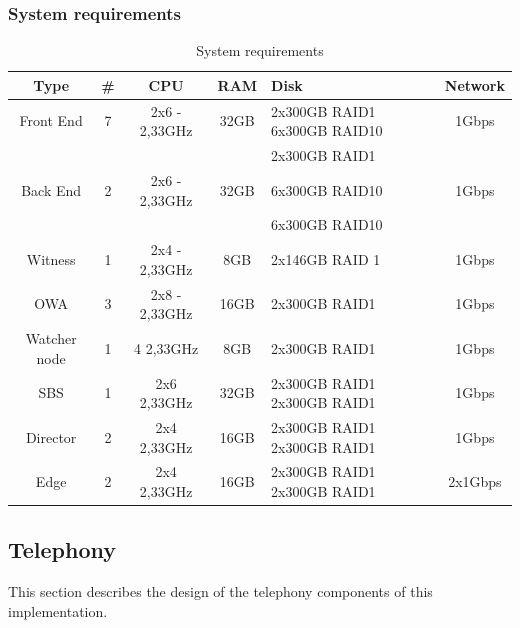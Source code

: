 	\subsubsection{System requirements}
	\begin{table}[H]
		\centering
		\begin{tabularx}{\textwidth}{ccccXc}
			\textbf{Type} & \# & \textbf{CPU} & \textbf{RAM} & \textbf{Disk} & \textbf{Network}\\ \hline 
			Front End & 7 & 2x6 - 2,33GHz & 32GB & 2x300GB RAID1 \newline 6x300GB RAID10 & 1Gbps \\ \hline 
			
			&&&& 2x300GB RAID1 & \\
			Back End & 2 & 2x6 - 2,33GHz & 32GB & 6x300GB RAID10 & 1Gbps \\
			&&&& 6x300GB RAID10 & \\ \hline 
			
			Witness & 1 & 2x4 - 2,33GHz & 8GB & 2x146GB RAID 1 & 1Gbps \\ \hline 
			
			OWA & 3 & 2x8 - 2,33GHz & 16GB & 2x300GB RAID1 & 1Gbps \\ \hline 
			
			Watcher node & 1 & 4 2,33GHz & 8GB & 2x300GB RAID1 & 1Gbps \\ \hline 
			
			SBS & 1 & 2x6 2,33GHz & 32GB & 2x300GB RAID1 \newline 2x300GB RAID1 & 1Gbps \\ \hline 
			
			Director & 2 & 2x4 2,33GHz & 16GB & 2x300GB RAID1 \newline 2x300GB RAID1 & 1Gbps \\ \hline 
			
			Edge & 2 & 2x4 2,33GHz & 16GB & 2x300GB RAID1 \newline 2x300GB RAID1 & 2x1Gbps \\
		\end{tabularx}
		\caption{\label{tab:case_sysreq} System requirements}
		\end{table}


\subsection{Telephony}

This section describes the design of the telephony components of this implementation.

